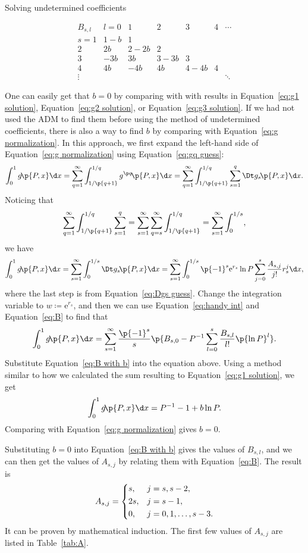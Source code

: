 \documentclass[oneside,12pt,final]{ucthesis-CA2012}
\newcommand{\mrm}[1]{\mathrm{#1}}
\newcommand{\ceq}{\coloneqq}
\newcommand{\e}{\mrm{e}}
\newcommand{\fr}{\frac}
\newcommand{\fc}[2]{#1\mathchoice{\!}{\!}{}{}\p{#2}} %
\begin{document}
\begin{mainmatter}
\begin{section}{Solving undetermined coefficients}
\begin{table}[h!]
	\caption{The first few $B_{s,l}$ given $b\ceq1-B_{1,0}$. The actual value of $b$ is $b=0$.}
	\label{tab:B}
	\[\begin{array}{r|cccccc}
		B_{s,l}&l=0&1&2&3&4&\cdots\\
		\hline
		s=1&1-b&1\\
		2&2b&2-2b&2\\
		3&-3b&3b&3-3b&3\\
		4&4b&-4b&4b&4-4b&4\\
		\vdots&&&&&&\ddots
	\end{array}\]
\end{table}

One can easily get that $b=0$ by comparing with with results in Equation~\ref{eq:g1 solution},
Equation~\ref{eq:g2 solution}, or Equation~\ref{eq:g3 solution}.
If we had not used the ADM to find them before using the method of undetermined coefficients,
there is also a way to find $b$ by comparing with Equation~\ref{eq:g normalization}.
In this approach, we first expand the left-hand side of Equation~\ref{eq:g normalization}
using Equation~\ref{eq:gq guess}:
\[\int_0^1\fc g{P,x}\d x
=\sum_{q=1}^\infty\int_{1/\p{q+1}}^{1/q}\fc{g^{\p q}}{P,x}\d x
=\sum_{q=1}^\infty\int_{1/\p{q+1}}^{1/q}\sum_{s=1}^q\fc{\Dt g_s}{P,x}\d x.\]
Noticing that
\[\sum_{q=1}^\infty\int_{1/\p{q+1}}^{1/q}\sum_{s=1}^q
=\sum_{s=1}^\infty\sum_{q=s}^\infty\int_{1/\p{q+1}}^{1/q}
=\sum_{s=1}^\infty\int_0^{1/s},\]
we have
\[\int_0^1\fc g{P,x}\d x
=\sum_{s=1}^\infty\int_0^{1/s}\fc{\Dt g_s}{P,x}\d x
=\sum_{s=1}^\infty\int_0^{1/s}\p{-1}^s\e^{r_s}\ln P\sum_{j=0}^s\fr{A_{s,j}}{j!}r_s^j\d x,\]
where the last step is from Equation~\ref{eq:Dgs guess}.
Change the integration variable to $w\ceq\e^{r_s}$,
and then we can use Equation~\ref{eq:handy int} and Equation~\ref{eq:B} to find that
\[\int_0^1\fc g{P,x}\d x
=\sum_{s=1}^\infty\fr{\p{-1}^s}s\p{B_{s,0}-P^{-1}\sum_{l=0}^s\fr{B_{s,l}}{l!}\p{\ln P}^l}.\]
Substitute Equation~\ref{eq:B with b} into the equation above.
Using a method similar to how we calculated the sum resulting to Equation~\ref{eq:g1 solution},
we get
\[\int_0^1\fc g{P,x}\d x=P^{-1}-1+b\ln P.\]
Comparing with Equation~\ref{eq:g normalization} gives $b=0$.

Substituting $b=0$ into Equation~\ref{eq:B with b} gives the values of $B_{s,l}$,
and we can then get the values of $A_{s,j}$ by relating them with Equation~\ref{eq:B}.
The result is
\begin{equation}
	\label{eq:A}
	A_{s,j}=\begin{dcases}
		s,&j=s,s-2,\\
		2s,&j=s-1,\\
		0,&j=0,1,\ldots,s-3.
	\end{dcases}
\end{equation}
It can be proven by mathematical induction.
The first few values of $A_{s,j}$ are listed in Table~\ref{tab:A}.


\end{section}
\end{mainmatter}
\end{document}
